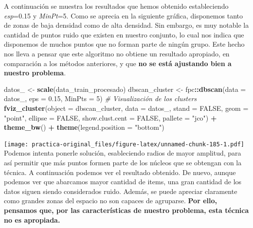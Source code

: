 \documentclass[spanish,]{article}
\newenvironment{Shaded}{\begin{snugshade}}{\end{snugshade}}
\newcommand{\KeywordTok}[1]{\textcolor[rgb]{0.13,0.29,0.53}{\textbf{#1}}}
\newcommand{\DataTypeTok}[1]{\textcolor[rgb]{0.13,0.29,0.53}{#1}}
\newcommand{\DecValTok}[1]{\textcolor[rgb]{0.00,0.00,0.81}{#1}}
\newcommand{\FloatTok}[1]{\textcolor[rgb]{0.00,0.00,0.81}{#1}}
\newcommand{\StringTok}[1]{\textcolor[rgb]{0.31,0.60,0.02}{#1}}
\newcommand{\CommentTok}[1]{\textcolor[rgb]{0.56,0.35,0.01}{\textit{#1}}}
\newcommand{\OtherTok}[1]{\textcolor[rgb]{0.56,0.35,0.01}{#1}}
\newcommand{\OperatorTok}[1]{\textcolor[rgb]{0.81,0.36,0.00}{\textbf{#1}}}
\newcommand{\NormalTok}[1]{#1}
\begin{document}
A continuación se muestra los resultados que hemos obtenido
estableciendo \emph{esp}=0.15 y \emph{MinPt}=5. Como se aprecia en la
siguiente gráfica, disponemos tanto de zonas de baja densidad como de
alta densidad. Sin embargo, es muy notable la cantidad de puntos ruido
que existen en nuestro conjunto, lo cual nos indica que disponemos de
muchos puntos que no forman parte de ningún grupo. Este hecho nos lleva
a pensar que este algoritmo no obtiene un resultado apropiado, en
comparación a los métodos anteriores, y que \textbf{no se está ajustando
bien a nuestro problema}.

\begin{Shaded}
\begin{Highlighting}[]
\NormalTok{datos_ <-}\StringTok{ }\KeywordTok{scale}\NormalTok{(data_train_procesado)}
\NormalTok{dbscan_cluster <-}\StringTok{ }\NormalTok{fpc}\OperatorTok{::}\KeywordTok{dbscan}\NormalTok{(}\DataTypeTok{data =}\NormalTok{ datos_, }\DataTypeTok{eps =} \FloatTok{0.15}\NormalTok{, }\DataTypeTok{MinPts =} \DecValTok{5}\NormalTok{)}
\CommentTok{# Visualización de los clusters}
\KeywordTok{fviz_cluster}\NormalTok{(}\DataTypeTok{object =}\NormalTok{ dbscan_cluster, }\DataTypeTok{data =}\NormalTok{ datos_, }\DataTypeTok{stand =} \OtherTok{FALSE}\NormalTok{,}
             \DataTypeTok{geom =} \StringTok{"point"}\NormalTok{, }\DataTypeTok{ellipse =} \OtherTok{FALSE}\NormalTok{, }\DataTypeTok{show.clust.cent =} \OtherTok{FALSE}\NormalTok{,}
             \DataTypeTok{pallete =} \StringTok{"jco"}\NormalTok{) }\OperatorTok{+}
\StringTok{  }\KeywordTok{theme_bw}\NormalTok{() }\OperatorTok{+}
\StringTok{  }\KeywordTok{theme}\NormalTok{(}\DataTypeTok{legend.position =} \StringTok{"bottom"}\NormalTok{)}
\end{Highlighting}
\end{Shaded}

\texttt{[image: practica-original\_files/figure-latex/unnamed-chunk-185-1.pdf]}
Podemos intenta ponerle solución, esableciendo radios de mayor amplitud,
para así permitir que más puntos formen parte de los núcleos que se
obtengan con la técnica. A continuación podemos ver el resultado
obtenido. De nuevo, aunque podemos ver que abarcamos mayor cantidad de
items, una gran cantidad de los datos siguen siendo considerados ruido.
Además, se puede apreciar claramente como grandes zonas del espacio no
son capaces de agruparse. \textbf{Por ello, pensamos que, por las
características de nuestro problema, esta técnica no es apropiada.}
\end{document}
